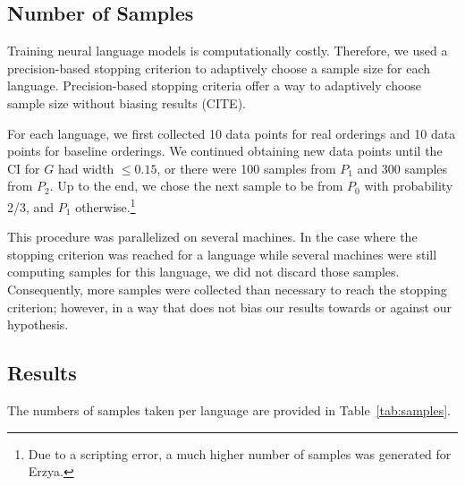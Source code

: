 %



\subsection{Number of Samples}
Training neural language models is computationally costly.
Therefore, we used a precision-based stopping criterion to adaptively choose a sample size for each language.
Precision-based stopping criteria offer a way to adaptively choose sample size without biasing results (CITE).

For each language, we first collected 10 data points for real orderings and 10 data points for baseline orderings.
We continued obtaining new data points until the CI for $G$ had width $\leq 0.15$, or there were 100 samples from $P_1$ and 300 samples from $P_2$.
Up to the end, we chose the next sample to be from $P_0$ with probability 2/3, and $P_1$ otherwise.\footnote{Due to a scripting error, a much higher number of samples was generated for Erzya.}

This procedure was parallelized on several machines.
In the case where the stopping criterion was reached for a language while several machines were still computing samples for this language, we did not discard those samples.
Consequently, more samples were collected than necessary to reach the stopping criterion; however, in a way that does not bias our results towards or against our hypothesis.





\subsection{Results}




The numbers of samples taken per language are provided in Table~\ref{tab:samples}.

